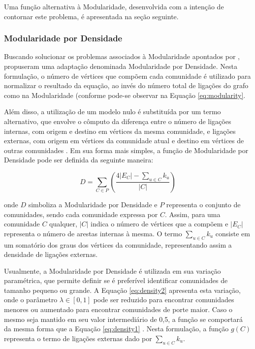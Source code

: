 Uma função alternativa à Modularidade, desenvolvida com a intenção de contornar este problema, é apresentada na seção seguinte.

\subsubsection{Modularidade por Densidade} \label{sec:density}

Buscando solucionar os problemas associados à Modularidade apontados por ,  propuseram uma adaptação denominada Modularidade por Densidade. Nesta formulação, o número de vértices que compõem cada comunidade é utilizado para normalizar o resultado da equação, ao invés do número total de ligações do grafo como na Modularidade (conforme pode-se observar na Equação \ref{eq:modularity}.

Além disso, a utilização de um modelo nulo é substituída por um termo alternativo, que envolve o cômputo da diferença entre o número de ligações internas, com origem e destino em vértices da mesma comunidade, e ligações externas, com origem em vértices da comunidade atual e destino em vértices de outras comunidades \cite{Li2008,Santiago2017}. Em sua forma mais simples, a função de Modularidade por Densidade pode ser definida da seguinte maneira:

\begin{equation}
    \label{eq:density1}
    D = \sum_{C \in P} \left ( \frac{4|E_C| - \sum_{u \in C} k_u}{|C|} \right )
\end{equation}

\noindent onde $D$ simboliza a Modularidade por Densidade e $P$ representa o conjunto de comunidades, sendo cada comunidade expressa por $C$. Assim, para uma comunidade $C$ qualquer, $|C|$ indica o número de vértices que a compõem e $|E_C|$ representa o número de arestas internas à mesma. O termo $\sum_{u \in C} k_u$ consiste em um somatório dos graus dos vértices da comunidade, representando assim a densidade de ligações externas.

Usualmente, a Modularidade por Densidade é utilizada em sua variação paramétrica, que permite definir se é preferível identificar comunidades de tamanho pequeno ou grande. A Equação \ref{eq:density2} apresenta esta variação, onde o parâmetro $\lambda \in [0, 1]$ pode ser reduzido para encontrar comunidades menores ou aumentado para encontrar comunidades de porte maior. Caso o mesmo seja mantido em seu valor intermediário de 0,5, a função se comportará da mesma forma que a Equação \ref{eq:density1} \cite{Li2008,Santiago2017}. Nesta formulação, a função $g(C)$ representa o termo de ligações externas dado por $\sum_{u \in C} k_u$.

